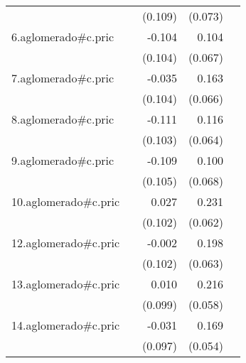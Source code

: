 {\begin{longtable}{l*{4}{D{.}{.}{-1}}}
            &                     &     (0.109)         &     (0.073)         &                     \\
\addlinespace
6.aglomerado#c.pric&                     &      -0.104         &       0.104         &                     \\
            &                     &     (0.104)         &     (0.067)         &                     \\
\addlinespace
7.aglomerado#c.pric&                     &      -0.035         &       0.163\sym{*}  &                     \\
            &                     &     (0.104)         &     (0.066)         &                     \\
\addlinespace
8.aglomerado#c.pric&                     &      -0.111         &       0.116         &                     \\
            &                     &     (0.103)         &     (0.064)         &                     \\
\addlinespace
9.aglomerado#c.pric&                     &      -0.109         &       0.100         &                     \\
            &                     &     (0.105)         &     (0.068)         &                     \\
\addlinespace
10.aglomerado#c.pric&                     &       0.027         &       0.231\sym{***}&                     \\
            &                     &     (0.102)         &     (0.062)         &                     \\
\addlinespace
12.aglomerado#c.pric&                     &      -0.002         &       0.198\sym{**} &                     \\
            &                     &     (0.102)         &     (0.063)         &                     \\
\addlinespace
13.aglomerado#c.pric&                     &       0.010         &       0.216\sym{***}&                     \\
            &                     &     (0.099)         &     (0.058)         &                     \\
\addlinespace
14.aglomerado#c.pric&                     &      -0.031         &       0.169\sym{**} &                     \\
            &                     &     (0.097)         &     (0.054)         &                     \\

\end{longtable}}
